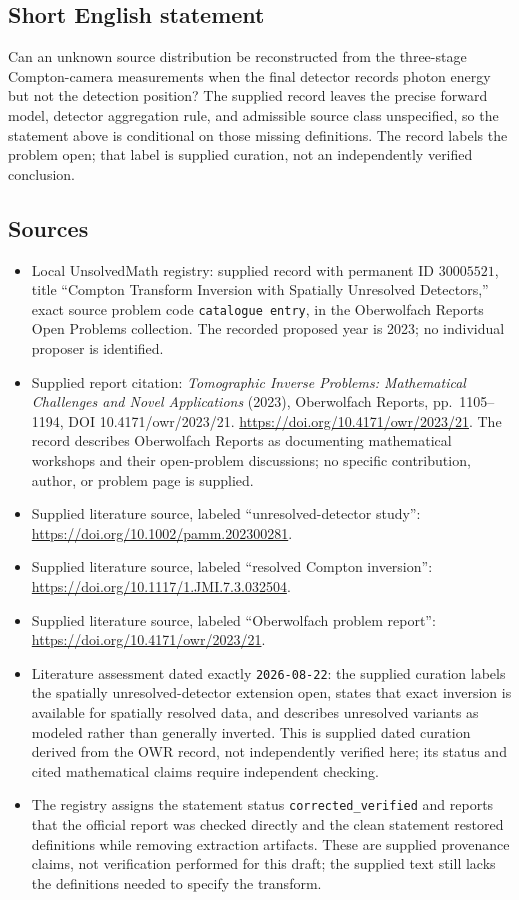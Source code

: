 \documentclass[11pt]{article}
\begin{document}
\subsection{Short English statement}
Can an unknown source distribution be reconstructed from the three-stage Compton-camera measurements when the final detector records photon energy but not the detection position? The supplied record leaves the precise forward model, detector aggregation rule, and admissible source class unspecified, so the statement above is conditional on those missing definitions. The record labels the problem open; that label is supplied curation, not an independently verified conclusion.
\subsection{Sources}
\begin{itemize}
\item Local UnsolvedMath registry: supplied record with permanent ID \(30005521\), title ``Compton Transform Inversion with Spatially Unresolved Detectors,'' exact source problem code \texttt{catalogue entry}, in the Oberwolfach Reports Open Problems collection. The recorded proposed year is 2023; no individual proposer is identified.
\item Supplied report citation: \emph{Tomographic Inverse Problems: Mathematical Challenges and Novel Applications} (2023), Oberwolfach Reports, pp.~1105--1194, DOI 10.4171/owr/2023/21. \url{https://doi.org/10.4171/owr/2023/21}. The record describes Oberwolfach Reports as documenting mathematical workshops and their open-problem discussions; no specific contribution, author, or problem page is supplied.
\item Supplied literature source, labeled ``unresolved-detector study'': \url{https://doi.org/10.1002/pamm.202300281}.
\item Supplied literature source, labeled ``resolved Compton inversion'': \url{https://doi.org/10.1117/1.JMI.7.3.032504}.
\item Supplied literature source, labeled ``Oberwolfach problem report'': \url{https://doi.org/10.4171/owr/2023/21}.
\item Literature assessment dated exactly \texttt{2026-08-22}: the supplied curation labels the spatially unresolved-detector extension open, states that exact inversion is available for spatially resolved data, and describes unresolved variants as modeled rather than generally inverted. This is supplied dated curation derived from the OWR record, not independently verified here; its status and cited mathematical claims require independent checking.
\item The registry assigns the statement status \texttt{corrected\_verified} and reports that the official report was checked directly and the clean statement restored definitions while removing extraction artifacts. These are supplied provenance claims, not verification performed for this draft; the supplied text still lacks the definitions needed to specify the transform.
\end{itemize}
\end{document}

